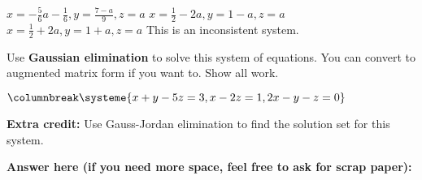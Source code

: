 \documentclass{exam}
\begin{document}
\begin{questions}
\begin{multicols}{2}
\columnbreak
\begin{choices}
\choice $ x = -\frac{5}{6}a - \frac{1}{6} , y = \frac{7-a}{9}, z = a$
\choice $ x = \frac{1}{2} - 2a, y = 1 - a, z = a $
\choice $ x = \frac{1}{2} + 2a, y = 1 +a, z = a $
\choice This is an inconsistent system.
\end{choices}
\vspace{0.5cm}

\end{multicols}

\newpage

\question
\begin{multicols}{2}
Use \textbf{Gaussian elimination} to solve this system of equations.  You can convert to augmented matrix form if you want to.  Show all work.


$
\columnbreak
\systeme{
x + y - 5z = 3,
x    - 2z = 1,
2x - y - z = 0
}
$
\end{multicols}

\textbf{Extra credit: } Use Gauss-Jordan elimination to find the solution set for this system.

\textbf{Answer here (if you need more space, feel free to ask for scrap paper): }

\end{questions}

\thispagestyle{empty}
\end{document}
